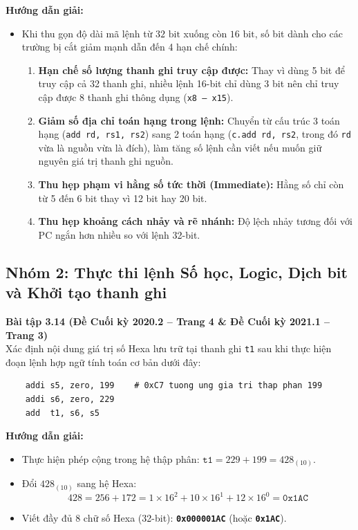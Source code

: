 \textbf{Hướng dẫn giải:}
\begin{itemize}
    \item Khi thu gọn độ dài mã lệnh từ $32\text{ bit}$ xuống còn $16\text{ bit}$, số bit dành cho các trường bị cắt giảm mạnh dẫn đến 4 hạn chế chính:
    \begin{enumerate}
        \item \textbf{Hạn chế số lượng thanh ghi truy cập được:} Thay vì dùng 5 bit để truy cập cả 32 thanh ghi, nhiều lệnh 16-bit chỉ dùng 3 bit nên chỉ truy cập được 8 thanh ghi thông dụng (\texttt{x8 -- x15}).
        \item \textbf{Giảm số địa chỉ toán hạng trong lệnh:} Chuyển từ cấu trúc 3 toán hạng (\texttt{add rd, rs1, rs2}) sang 2 toán hạng (\texttt{c.add rd, rs2}, trong đó \texttt{rd} vừa là nguồn vừa là đích), làm tăng số lệnh cần viết nếu muốn giữ nguyên giá trị thanh ghi nguồn.
        \item \textbf{Thu hẹp phạm vi hằng số tức thời (Immediate):} Hằng số chỉ còn từ 5 đến 6 bit thay vì 12 bit hay 20 bit.
        \item \textbf{Thu hẹp khoảng cách nhảy và rẽ nhánh:} Độ lệch nhảy tương đối với PC ngắn hơn nhiều so với lệnh 32-bit.
    \end{enumerate}
\end{itemize}

\subsection{Nhóm 2: Thực thi lệnh Số học, Logic, Dịch bit và Khởi tạo thanh ghi}

\textbf{Bài tập 3.14 (Đề Cuối kỳ 2020.2 -- Trang 4 \& Đề Cuối kỳ 2021.1 -- Trang 3)}\\
Xác định nội dung giá trị số Hexa lưu trữ tại thanh ghi \texttt{t1} sau khi thực hiện đoạn lệnh hợp ngữ tính toán cơ bản dưới đây:
\begin{lstlisting}
    addi s5, zero, 199    # 0xC7 tuong ung gia tri thap phan 199
    addi s6, zero, 229
    add  t1, s6, s5
\end{lstlisting}
\textbf{Hướng dẫn giải:}
\begin{itemize}
    \item Thực hiện phép cộng trong hệ thập phân: $\texttt{t1} = 229 + 199 = 428_{(10)}$.
    \item Đổi $428_{(10)}$ sang hệ Hexa:
    $$428 = 256 + 172 = 1 \times 16^2 + 10 \times 16^1 + 12 \times 16^0 = \texttt{0x1AC}$$
    \item Viết đầy đủ 8 chữ số Hexa (32-bit): \textbf{\texttt{0x000001AC}} (hoặc \textbf{\texttt{0x1AC}}).
\end{itemize}

